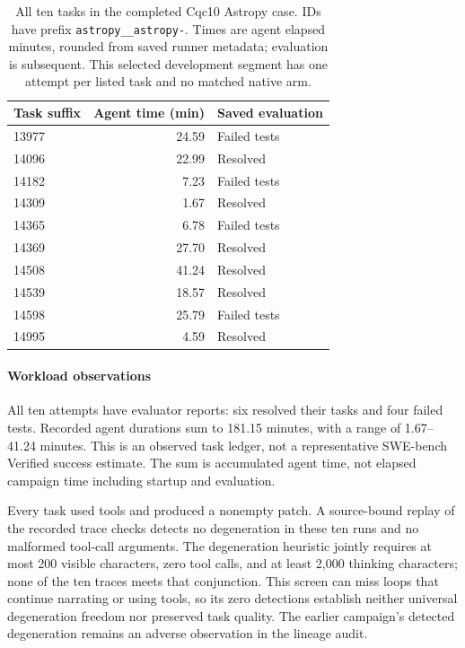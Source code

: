 \begin{table}[t]
\caption{All ten tasks in the completed Cqc10 Astropy case. IDs have prefix \texttt{astropy\_\_astropy-}. Times are agent elapsed minutes, rounded from saved runner metadata; evaluation is subsequent. This selected development segment has one attempt per listed task and no matched native arm.}
\label{tab:swe-tasks}
\centering\small
\begin{tabular}{@{}lrl@{}}
\toprule
Task suffix & Agent time (min) & Saved evaluation \\
\midrule
13977 & 24.59 & Failed tests \\
14096 & 22.99 & Resolved \\
14182 & 7.23 & Failed tests \\
14309 & 1.67 & Resolved \\
14365 & 6.78 & Failed tests \\
14369 & 27.70 & Resolved \\
14508 & 41.24 & Resolved \\
14539 & 18.57 & Resolved \\
14598 & 25.79 & Failed tests \\
14995 & 4.59 & Resolved \\
\bottomrule
\end{tabular}
\end{table}

\paragraph{Workload observations}
All ten attempts have evaluator reports: six resolved their tasks and four failed tests. Recorded agent durations sum to 181.15 minutes, with a range of 1.67--41.24 minutes. This is an observed task ledger, not a representative SWE-bench Verified success estimate. The sum is accumulated agent time, not elapsed campaign time including startup and evaluation.

Every task used tools and produced a nonempty patch. A source-bound replay of the recorded trace checks detects no degeneration in these ten runs and no malformed tool-call arguments. The degeneration heuristic jointly requires at most 200 visible characters, zero tool calls, and at least 2,000 thinking characters; none of the ten traces meets that conjunction. This screen can miss loops that continue narrating or using tools, so its zero detections establish neither universal degeneration freedom nor preserved task quality. The earlier campaign's detected degeneration remains an adverse observation in the lineage audit.

